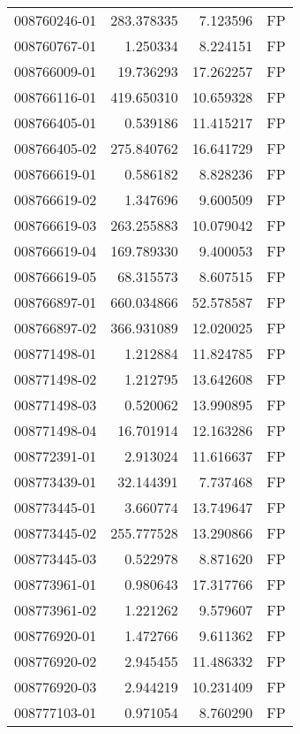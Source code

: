 \begin{tabular}{lrrl}
008760246-01 &  283.378335 &       7.123596 &   FP \\
008760767-01 &    1.250334 &       8.224151 &   FP \\
008766009-01 &   19.736293 &      17.262257 &   FP \\
008766116-01 &  419.650310 &      10.659328 &   FP \\
008766405-01 &    0.539186 &      11.415217 &   FP \\
008766405-02 &  275.840762 &      16.641729 &   FP \\
008766619-01 &    0.586182 &       8.828236 &   FP \\
008766619-02 &    1.347696 &       9.600509 &   FP \\
008766619-03 &  263.255883 &      10.079042 &   FP \\
008766619-04 &  169.789330 &       9.400053 &   FP \\
008766619-05 &   68.315573 &       8.607515 &   FP \\
008766897-01 &  660.034866 &      52.578587 &   FP \\
008766897-02 &  366.931089 &      12.020025 &   FP \\
008771498-01 &    1.212884 &      11.824785 &   FP \\
008771498-02 &    1.212795 &      13.642608 &   FP \\
008771498-03 &    0.520062 &      13.990895 &   FP \\
008771498-04 &   16.701914 &      12.163286 &   FP \\
008772391-01 &    2.913024 &      11.616637 &   FP \\
008773439-01 &   32.144391 &       7.737468 &   FP \\
008773445-01 &    3.660774 &      13.749647 &   FP \\
008773445-02 &  255.777528 &      13.290866 &   FP \\
008773445-03 &    0.522978 &       8.871620 &   FP \\
008773961-01 &    0.980643 &      17.317766 &   FP \\
008773961-02 &    1.221262 &       9.579607 &   FP \\
008776920-01 &    1.472766 &       9.611362 &   FP \\
008776920-02 &    2.945455 &      11.486332 &   FP \\
008776920-03 &    2.944219 &      10.231409 &   FP \\
008777103-01 &    0.971054 &       8.760290 &   FP \\

\end{tabular}
